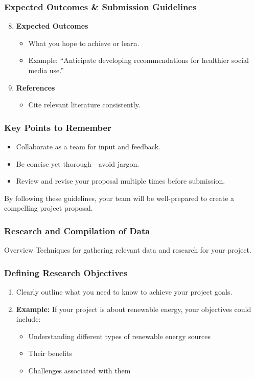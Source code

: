 \documentclass[aspectratio=169]{beamer}
\begin{document}
\begin{frame}[fragile]
    \frametitle{Expected Outcomes & Submission Guidelines}
    \begin{enumerate}
        \setcounter{enumi}{7} %
        \item \textbf{Expected Outcomes}
            \begin{itemize}
                \item What you hope to achieve or learn.
                \item Example: “Anticipate developing recommendations for healthier social media use.”
            \end{itemize}
        \item \textbf{References}
            \begin{itemize}
                \item Cite relevant literature consistently.
            \end{itemize}
    \end{enumerate}
\end{frame}

\begin{frame}[fragile]
    \frametitle{Key Points to Remember}
    \begin{itemize}
        \item Collaborate as a team for input and feedback.
        \item Be concise yet thorough—avoid jargon.
        \item Review and revise your proposal multiple times before submission.
    \end{itemize}
    By following these guidelines, your team will be well-prepared to create a compelling project proposal.
\end{frame}

\begin{frame}[fragile]
    \frametitle{Research and Compilation of Data}
    \begin{block}{Overview}
        Techniques for gathering relevant data and research for your project.
    \end{block}
\end{frame}

\begin{frame}[fragile]
    \frametitle{Defining Research Objectives}
    \begin{enumerate}
        \item Clearly outline what you need to know to achieve your project goals.
        \item \textbf{Example:} If your project is about renewable energy, your objectives could include:
        \begin{itemize}
            \item Understanding different types of renewable energy sources
            \item Their benefits
            \item Challenges associated with them
        \end{itemize}
    \end{enumerate}
\end{frame}
\end{document}
